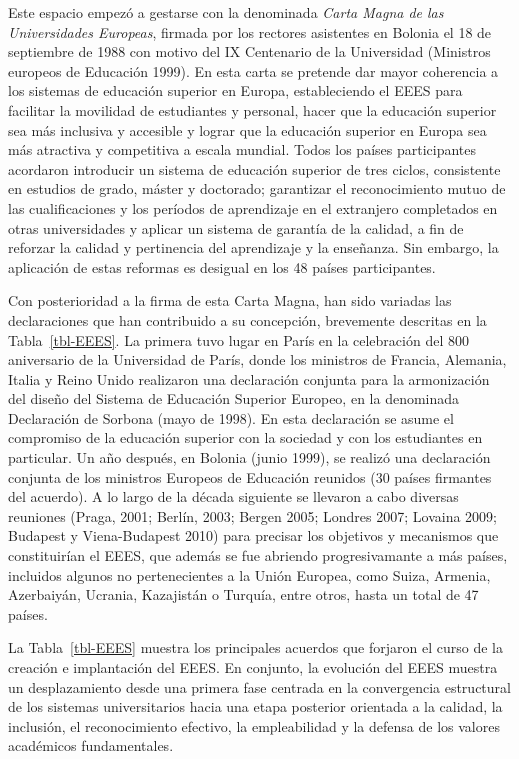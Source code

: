 \documentclass[
  11pt,
  a4paper,
  twoside]{scrreprt}
\begin{document}
Este espacio empezó a gestarse con la denominada \emph{Carta Magna de
las Universidades Europeas}, firmada por los rectores asistentes en
Bolonia el 18 de septiembre de 1988 con motivo del IX Centenario de la
Universidad (Ministros europeos de Educación 1999). En esta carta se
pretende dar mayor coherencia a los sistemas de educación superior en
Europa, estableciendo el EEES para facilitar la movilidad de estudiantes
y personal, hacer que la educación superior sea más inclusiva y
accesible y lograr que la educación superior en Europa sea más atractiva
y competitiva a escala mundial. Todos los países participantes acordaron
introducir un sistema de educación superior de tres ciclos, consistente
en estudios de grado, máster y doctorado; garantizar el reconocimiento
mutuo de las cualificaciones y los períodos de aprendizaje en el
extranjero completados en otras universidades y aplicar un sistema de
garantía de la calidad, a fin de reforzar la calidad y pertinencia del
aprendizaje y la enseñanza. Sin embargo, la aplicación de estas reformas
es desigual en los 48 países participantes.

Con posterioridad a la firma de esta Carta Magna, han sido variadas las
declaraciones que han contribuido a su concepción, brevemente descritas
en la Tabla~\ref{tbl-EEES}. La primera tuvo lugar en París en la
celebración del 800 aniversario de la Universidad de París, donde los
ministros de Francia, Alemania, Italia y Reino Unido realizaron una
declaración conjunta para la armonización del diseño del Sistema de
Educación Superior Europeo, en la denominada Declaración de Sorbona
(mayo de 1998). En esta declaración se asume el compromiso de la
educación superior con la sociedad y con los estudiantes en particular.
Un año después, en Bolonia (junio 1999), se realizó una declaración
conjunta de los ministros Europeos de Educación reunidos (30 países
firmantes del acuerdo). A lo largo de la década siguiente se llevaron a
cabo diversas reuniones (Praga, 2001; Berlín, 2003; Bergen 2005; Londres
2007; Lovaina 2009; Budapest y Viena-Budapest 2010) para precisar los
objetivos y mecanismos que constituirían el EEES, que además se fue
abriendo progresivamante a más países, incluidos algunos no
pertenecientes a la Unión Europea, como Suiza, Armenia, Azerbaiyán,
Ucrania, Kazajistán o Turquía, entre otros, hasta un total de 47 países.

La Tabla~\ref{tbl-EEES} muestra los principales acuerdos que forjaron el
curso de la creación e implantación del EEES. En conjunto, la evolución
del EEES muestra un desplazamiento desde una primera fase centrada en la
convergencia estructural de los sistemas universitarios hacia una etapa
posterior orientada a la calidad, la inclusión, el reconocimiento
efectivo, la empleabilidad y la defensa de los valores académicos
fundamentales.
\end{document}
